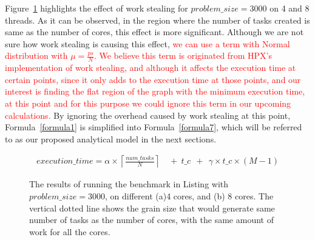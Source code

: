 Figure~\ref{fig40} highlights the effect of work stealing for $problem\_size=3000$ on 4 and 8 threads. As it can be observed, in the region where the number of tasks created is same as the number of cores, this effect is more significant. Although we are not sure how work stealing is causing this effect, \textcolor{red}{we can use a term with Normal distribution with $\mu=\frac{ps}{N}$. We believe this term is originated from HPX's implementation of work stealing, and although it affects the execution time at certain points, since it only adds to the execution time at those points, and our interest is finding the flat region of the graph with the minimum execution time, at this point and for this purpose we could ignore this term in our upcoming calculations.}  
By ignoring the overhead caused by work stealing at this point, Formula~\ref{formula1} is simplified into Formula~\ref{formula7}, which will be referred to as our proposed analytical model in the next sections. 

\begin{equation}\label{formula7}
\begin{aligned}
execution\_time = 
\alpha\times{\left\lceil{\frac{num\_{tasks}}{N}}\right\rceil}\:\:&+\:\:t\_c\:\:+\:\:\gamma\times{t\_c}\times{(M-1)}
\end{aligned}
\end{equation}

\vspace{\baselineskip}	
\begin{figure}[H]
	\centering
	\caption{The results of running the benchmark in Listing with $problem\_size=3000$, on different (a)4 cores, and (b) 8 cores. The vertical dotted line shows the grain size that would generate same number of tasks as the number of cores, with the same amount of work for all the cores.}\label{fig40}		
\end{figure}
 
